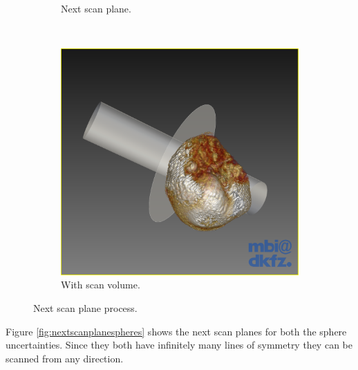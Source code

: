 \begin{figure}[H]
\begin{subfigure}[b]{0.32\textwidth}
    \caption*{Next scan plane.}
    \label{fig:nextscanplane1}
  \end{subfigure}%
  ~ %
  \begin{subfigure}[b]{0.32\textwidth}
    \includegraphics[width=\textwidth]{images/next_scan_plane/next_scan_plane_2.png}
    \caption*{With scan volume.}
    \label{fig:nextscanplane2}  
  \end{subfigure}
  \caption{Next scan plane process.}\label{fig:nextscanplane}
\end{figure}

Figure \ref{fig:nextscanplanespheres} shows the next scan planes for both the sphere uncertainties. Since they both have infinitely many lines of symmetry they can be scanned from any direction.

